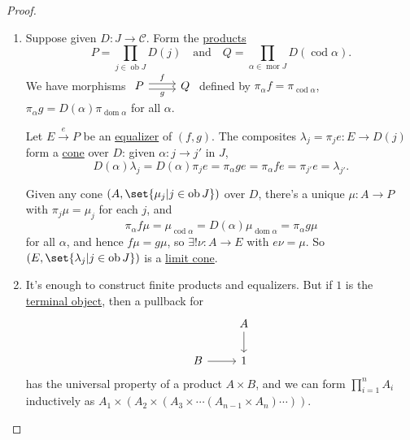 \documentclass{article}
\DeclareMathOperator{\ob}{ob}
\DeclareMathOperator{\mor}{mor}
\DeclareMathOperator{\dom}{dom}
\DeclareMathOperator{\cod}{cod}
\begin{document}
\begin{proof}\leavevmode
  \begin{enumerate}[label=(\roman*)]
    \item Suppose given $D: J \to \mathscr{C}$.
      Form the \hyperlink{def:lprod}{products}
      \begin{equation*}
        P = \prod_{j \in \ob J} D(j) \quad \text{and}\quad
        Q = \prod_{\alpha\in\mor J} D(\cod \alpha).
      \end{equation*}
    We have morphisms $\begin{tikzcd}P \rar[shift left]{f} \rar[shift right,']{g} & Q\end{tikzcd}$ defined by $\pi_\alpha f = \pi_{\cod \alpha}$, $\pi_\alpha g = D(\alpha) \pi_{\dom \alpha}$ for all $\alpha$.

    Let $E \xrightarrow{e} P$ be an \hyperlink{def:equalizer}{equalizer} of $(f,g)$.
    The composites $\lambda_j = \pi_j e: E \to D(j)$ form a \hyperlink{def:cone}{cone} over $D$:
    given $\alpha: j \to j'$ in $J$,
    \begin{equation*}
      D(\alpha) \lambda_j = D(\alpha) \pi_j e = \pi_\alpha g e = \pi_\alpha f e = \pi_{j'} e = \lambda_{j'}.
    \end{equation*}

    Given any cone $(A, \set{\mu_j | j \in \ob J})$ over $D$, there's a unique $\mu: A \to P$ with $\pi_j \mu = \mu_j$ for each $j$, and
    \begin{equation*}
      \pi_\alpha f \mu = \mu_{\cod \alpha} = D(\alpha) \mu_{\dom \alpha} = \pi_\alpha g \mu
    \end{equation*}
    for all $\alpha$, and hence $f\mu = g\mu$, so $\exists ! \nu: A \to E$ with $e \nu = \mu$.
    So $(E, \set{\lambda_j | j \in \ob J})$ is a \hyperlink{def:limit}{limit cone}.
  \item It's enough to construct finite products and equalizers.
    But if $1$ is the \hyperlink{def:terminal}{terminal object}, then a pullback for
    \begin{equation*}
      \begin{tikzcd}
        & A \dar \\
        B \rar & 1
      \end{tikzcd}
    \end{equation*}
    has the universal property of a product $A \times B$, and we can form $\prod_{i=1}^n A_i$ inductively as $A_1 \times (A_2 \times (A_3 \times \dotsm (A_{n-1} \times A_n) \dotsm)).$


\end{enumerate}
\end{proof}
\end{document}
